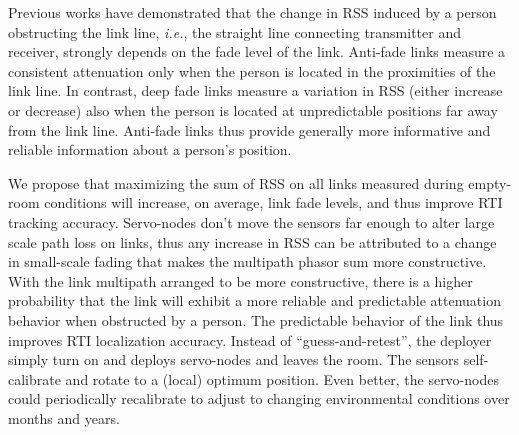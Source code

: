 \documentclass[conference]{IEEEtran}
\begin{document}
Previous works \cite{EvAAL_book,Wilson_SkewL_2011,MASS_2012,multi_scale_arxiv} have demonstrated that the change in RSS induced by a person obstructing the link line, \emph{i.e.}, the straight line connecting transmitter and receiver, strongly depends on the fade level of the link. Anti-fade links measure a consistent attenuation only when the person is located in the proximities of the link line. In contrast, deep fade links measure a variation in RSS (either increase or decrease) also when the person is located at unpredictable positions far away from the link line.  Anti-fade links thus provide generally more informative and reliable information about a person's position.

We propose that maximizing the sum of RSS on all links measured during empty-room conditions will increase, on average, link fade levels, and thus improve RTI tracking accuracy.  Servo-nodes don't move the sensors far enough to alter large scale path loss on links, thus any increase in RSS can be attributed to a change in small-scale fading that makes the multipath phasor sum more constructive.  With the link multipath arranged to be more constructive, there is a higher probability that the link will exhibit a more reliable and predictable attenuation behavior when obstructed by a person.  The predictable behavior of the link thus improves RTI localization accuracy. Instead of ``guess-and-retest'', the deployer simply turn on and deploys servo-nodes and leaves the room.  The sensors self-calibrate and rotate to a (local) optimum position.  Even better, the servo-nodes could periodically recalibrate to adjust to changing environmental conditions over months and years.
\end{document}
